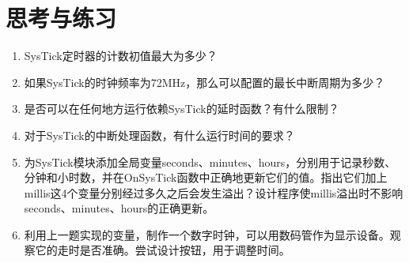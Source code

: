 \section{思考与练习}
\begin{enumerate}
	\item SysTick定时器的计数初值最大为多少？
	\item 如果SysTick的时钟频率为72MHz，那么可以配置的最长中断周期为多少？
	\item 是否可以在任何地方运行依赖SysTick的延时函数？有什么限制？
	\item 对于SysTick的中断处理函数，有什么运行时间的要求？
	\item 为SysTick模块添加全局变量seconds、minutes、hours，分别用于记录秒数、分钟和小时数，并在OnSysTick函数中正确地更新它们的值。指出它们加上millis这4个变量分别经过多久之后会发生溢出？设计程序使millis溢出时不影响seconds、minutes、hours的正确更新。
	\item 利用上一题实现的变量，制作一个数字时钟，可以用数码管作为显示设备。观察它的走时是否准确。尝试设计按钮，用于调整时间。
\end{enumerate}

















